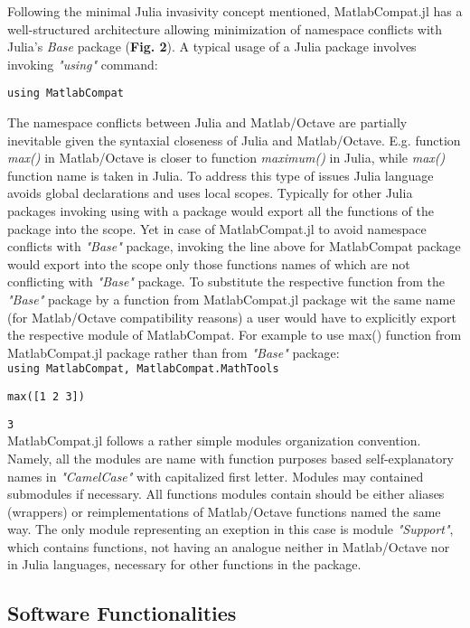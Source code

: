 Following the minimal Julia invasivity concept mentioned, MatlabCompat.jl has a well-structured architecture allowing minimization of namespace conflicts with Julia's \textit{Base} package (\textbf{Fig. 2}). A typical usage of a Julia package involves invoking \textit{"using"} command:

\verb|using MatlabCompat|

The namespace conflicts between Julia and Matlab/Octave are partially inevitable given the syntaxial closeness of Julia and Matlab/Octave. E.g. function \textit{max()} in Matlab/Octave is closer to function \textit{maximum()} in Julia, while \textit{max()} function name is taken in Julia. To address this type of issues Julia language avoids global declarations and uses local scopes. Typically for other Julia packages invoking using with a package would export all the functions of the package into the scope. Yet in case of MatlabCompat.jl to avoid namespace conflicts with \textit{"Base"} package, invoking the line above for MatlabCompat package would export into the scope only those functions names of which are not conflicting with \textit{"Base"} package. To substitute the respective function from the \textit{"Base"} package by a function from MatlabCompat.jl package wit the same name (for Matlab/Octave compatibility reasons) a user would have to explicitly export the respective module of MatlabCompat. For example to use max() function from MatlabCompat.jl package rather than from \textit{"Base"} package:\\

\verb|using MatlabCompat, MatlabCompat.MathTools|

\verb|max([1 2 3])|

\verb|3|\\


MatlabCompat.jl follows a rather simple modules organization convention. Namely, all the modules are name with function purposes based self-explanatory names in \textit{"CamelCase"} with capitalized first letter. Modules may contained submodules if necessary. All functions modules contain should be either aliases (wrappers) or reimplementations of Matlab/Octave functions named the same way. The only module representing an exeption in this case is module \textit{"Support"}, which contains functions, not having an analogue neither in Matlab/Octave nor in Julia languages, necessary for other functions in the package.

\subsection{Software Functionalities}

